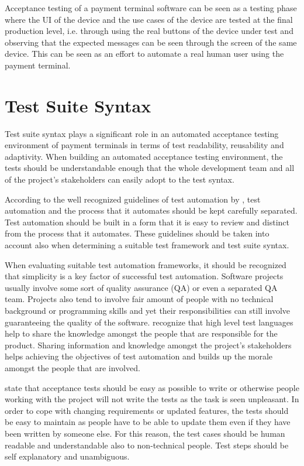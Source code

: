 Acceptance testing of a payment terminal software can be seen as a testing phase where the UI of the device and the use cases of the device are tested at the final production level, i.e. through using the real buttons of the device under test and observing that the expected messages can be seen through the screen of the same device. This can be seen as an effort to automate a real human user using the payment terminal.

\section{Test Suite Syntax}
\label{section:test suite syntax}

Test suite syntax plays a significant role in an automated acceptance testing environment of payment terminals in terms of test readability, reusability and adaptivity. When building an automated acceptance testing environment, the tests should be understandable enough that the whole development team and all of the project's stakeholders can easily adopt to the test syntax.

According to the well recognized guidelines of test automation by \cite{snakeoil}, test automation and the process that it automates should be kept carefully separated. Test automation should be built in a form that it is easy to review and distinct from the process that it automates. These guidelines should be taken into account also when determining a suitable test framework and test suite syntax.

When evaluating suitable test automation frameworks, it should be recognized that simplicity is a key factor of successful test automation. Software projects usually involve some sort of quality assurance (QA) or even a separated QA team. Projects also tend to involve fair amount of people with no technical background or programming skills and yet their responsibilities can still involve guaranteeing the quality of the software. \cite{just_enough} recognize that high level test languages help to share the knowledge amongst the people that are responsible for the product. Sharing information and knowledge amongst the project's stakeholders helps achieving the objectives of test automation and builds up the morale amongst the people that are involved.

\cite{lowell2003successful} state that acceptance tests should be easy as possible to write or otherwise people working with the project will not write the tests as the task is seen unpleasant. In order to cope with changing requirements or updated features, the tests should be easy to maintain as people have to be able to update them even if they have been written by someone else. For this reason, the test cases should be human readable and understandable also to non-technical people. Test steps should be self explanatory and unambiguous.

